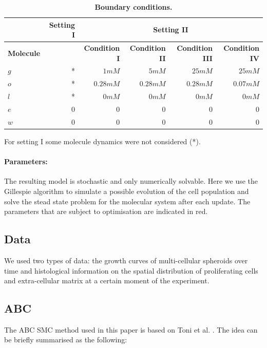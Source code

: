 \documentclass[10pt,letterpaper]{article}
\begin{document}
\begin{table}[!ht]
\begin{adjustwidth}{-0.5in}{0in} %
\caption{
{\bf Boundary conditions.}}
\begin{tabular}{|l |r |r|r|r|r|}
\hline
 			& {\bf Setting I} & \multicolumn{4}{|c|}{\bf Setting II}\\ \hline
{\bf Molecule} 	&			&{\bf Condition I} 	&{\bf Condition II} 	&{\bf Condition III} 	&{\bf Condition IV}\\ \hline
$g$			& * 			& $1mM$			&$5mM$			&$25mM$			&$25mM$\\ \hline
$o$			& *			& $0.28mM$		&$0.28mM$		&$0.28mM$		&$0.07mM$\\ \hline
$l$			& *			& $0mM$			&$0mM$			&$0mM$			&$0mM$\\ \hline
$e$			& 0 			& 0				&0				&0				&0\\ \hline
$w$			& 0 			& 0				&0				&0				&0\\ \hline
\end{tabular}
For setting I some molecule dynamics were not considered (*).
\label{tab:boundary conditions}
\end{adjustwidth}
\end{table}


\paragraph{Parameters:} 

The resulting model is stochastic and only numerically solvable. Here we use the Gillespie algorithm to simulate a possible evolution of the cell population and solve the stead state problem for the molecular system after each update. The parameters that are subject to optimisation are indicated in red.

\subsection*{Data} 
We used two types of data: the growth curves of multi-cellular spheroids over time and histological information on the spatial distribution of proliferating cells and extra-cellular matrix at a certain moment of the experiment.

\subsection*{ABC}
The ABC SMC method used in this paper is based on Toni et al. \cite{Toni2009}. The idea can be briefly summarised as the following: 
\end{document}
